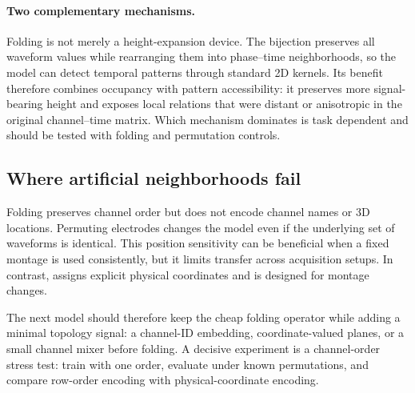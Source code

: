 \paragraph{Two complementary mechanisms.}
Folding is not merely a height-expansion device. The bijection preserves all
waveform values while rearranging them into phase--time neighborhoods, so the
model can detect temporal patterns through standard 2D kernels. Its benefit
therefore combines occupancy with pattern accessibility: it preserves more
signal-bearing height and exposes local relations that were distant or
anisotropic in the original channel--time matrix. Which mechanism dominates is
task dependent and should be tested with folding and permutation controls.

\subsection{Where artificial neighborhoods fail}

Folding preserves channel order but does not encode channel names or 3D
locations.  Permuting electrodes changes the model even if the underlying set
of waveforms is identical.  This position sensitivity can be beneficial when a
fixed montage is used consistently, but it limits transfer across acquisition
setups.  In contrast, \reve{} assigns explicit physical coordinates and is
designed for montage changes.

The next model should therefore keep the cheap folding operator while adding a
minimal topology signal: a channel-ID embedding, coordinate-valued planes, or a
small channel mixer before folding.  A decisive experiment is a channel-order
stress test: train with one order, evaluate under known permutations, and
compare row-order encoding with physical-coordinate encoding.
